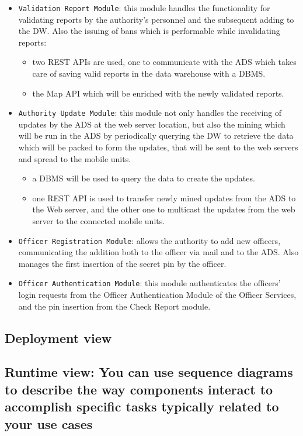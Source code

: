 \documentclass[12pt,a4paper]{article}
\begin{document}
\begin{itemize}
	\item \texttt{Validation Report Module}: this module handles the functionality for validating reports by the authority's personnel and the subsequent adding to the DW.  Also the issuing of bans which is performable while invalidating reports:
	\begin{itemize}
		\item two REST APIs are used, one to communicate with the ADS which takes care of saving valid reports in the data warehouse with a DBMS.
		\item the Map API which will be enriched with the newly validated reports.
		\end{itemize}
	\item \texttt{Authority Update Module}: this module not only handles the receiving of updates by the ADS at the web server location, but also the mining which will be run in the ADS by periodically querying the DW to retrieve the data which will be packed to form the updates, that will be sent to the web servers and spread to the mobile units.
\begin{itemize}
		\item a DBMS will be used to query the data to create the updates.
		\item one REST API is used to transfer newly mined updates from the ADS to the Web server, and the other one to multicast the updates from the web server to the connected mobile units.
		\end{itemize}
	\item \texttt{Officer Registration Module}: allows the authority to add new officers, communicating the addition both to the officer via mail and to the ADS. Also manages the first insertion of the secret pin by the officer.
	\item \texttt{Officer Authentication Module}: this module authenticates the officers' login requests from the Officer Authentication Module of the Officer Services, and the pin insertion from the Check Report module.
\end{itemize}


\subsection{Deployment view}
\subsection{Runtime view: You can use sequence diagrams to describe the way components interact to accomplish specific tasks typically related to your use cases}
\end{document}
